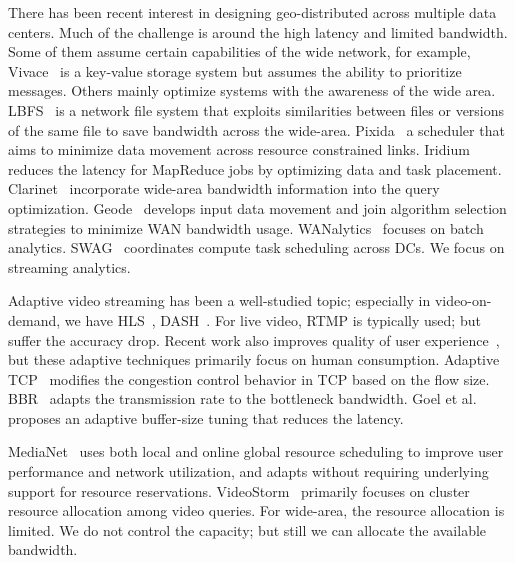  There has been recent interest in designing
geo-distributed across multiple data centers. Much of the challenge is around
the high latency and limited bandwidth. Some of them assume certain capabilities
of the wide network, for example, Vivace~\cite{cho2012surviving} is a key-value
storage system but assumes the ability to prioritize messages. Others mainly
optimize systems with the awareness of the wide
area. LBFS~\cite{muthitacharoen2001low} is a network file system that exploits
similarities between files or versions of the same file to save bandwidth across
the wide-area.  Pixida~\cite{kloudas2015pixida} a scheduler that aims to
minimize data movement across resource constrained links.
Iridium~\cite{pu2015low} reduces the latency for MapReduce jobs by optimizing
data and task placement. Clarinet~\cite{viswanathan2016clarinet} incorporate
wide-area bandwidth information into the query
optimization. Geode~\cite{vulimiri2015global} develops input data movement and
join algorithm selection strategies to minimize WAN bandwidth
usage. WANalytics~\cite{vulimiri2015wananlytics} focuses on batch
analytics. SWAG~\cite{hung2015scheduling} coordinates compute task scheduling
across DCs. We focus on streaming analytics.


 Adaptive video streaming has been a
well-studied topic; especially in video-on-demand, we have
HLS~\cite{pantos2016http}, DASH~\cite{michalos2012dynamic}. For live video, RTMP
is typically used; but suffer the accuracy drop. Recent work also improves
quality of user experience~\cite{yin2015control}, but these adaptive techniques
primarily focus on human consumption. Adaptive TCP~\cite{wu2013adaptive}
modifies the congestion control behavior in TCP based on the flow
size. BBR~\cite{cardwell2017bbr} adapts the transmission rate to the bottleneck
bandwidth. Goel et al.~\cite{goel2008low} proposes an adaptive buffer-size
tuning that reduces the latency.

 MediaNet~\cite{hicks2003user} uses both local
and online global resource scheduling to improve user performance and network
utilization, and adapts without requiring underlying support for resource
reservations. VideoStorm~\cite{zhang2017live} primarily focuses on cluster
resource allocation among video queries. For wide-area, the resource allocation
is limited. We do not control the capacity; but still we can allocate the
available bandwidth.



